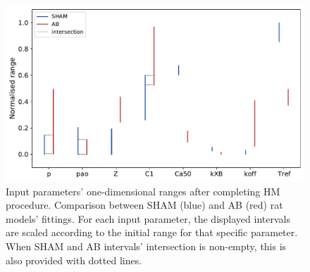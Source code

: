 \begin{figure}[!ht]
    \myfloatalign
    \includegraphics[width=\textwidth]{figures/chapter04/sham_vs_ab_final_ranges.pdf}
    \caption{Input parameters’ one-dimensional ranges after completing HM procedure. Comparison between SHAM (blue) and AB (red) rat models’ fittings. For each input parameter, the displayed intervals are scaled according to the initial range for that specific parameter. When SHAM and AB intervals’ intersection is non-empty, this is also provided with dotted lines.}
\end{figure}

